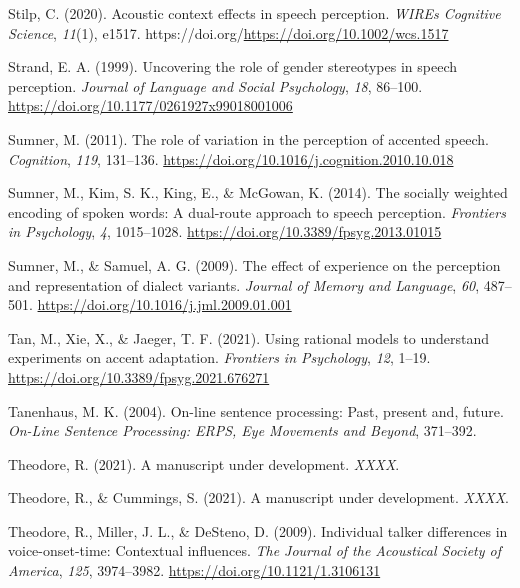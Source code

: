 \documentclass[
  11pt,
  english,
  man,floatsintext]{apa6}
\newlength{\cslhangindent}
\newlength{\cslentryspacingunit} %
\newenvironment{CSLReferences}[2] %
 {%
  \setlength{\parindent}{0pt}
  \ifodd #1
  \let\oldpar\par
  \def\par{\hangindent=\cslhangindent\oldpar}
  \fi
  \setlength{\parskip}{#2\cslentryspacingunit}
 }%
 {}
\begin{document}
\begin{CSLReferences}{1}{0}
\leavevmode{}%
Stilp, C. (2020). Acoustic context effects in speech perception. \emph{WIREs Cognitive Science}, \emph{11}(1), e1517. https://doi.org/\url{https://doi.org/10.1002/wcs.1517}

\leavevmode{}%
Strand, E. A. (1999). Uncovering the role of gender stereotypes in speech perception. \emph{Journal of Language and Social Psychology}, \emph{18}, 86--100. \url{https://doi.org/10.1177/0261927x99018001006}

\leavevmode{}%
Sumner, M. (2011). The role of variation in the perception of accented speech. \emph{Cognition}, \emph{119}, 131--136. \url{https://doi.org/10.1016/j.cognition.2010.10.018}

\leavevmode{}%
Sumner, M., Kim, S. K., King, E., \& McGowan, K. (2014). The socially weighted encoding of spoken words: A dual-route approach to speech perception. \emph{Frontiers in Psychology}, \emph{4}, 1015--1028. \url{https://doi.org/10.3389/fpsyg.2013.01015}

\leavevmode{}%
Sumner, M., \& Samuel, A. G. (2009). The effect of experience on the perception and representation of dialect variants. \emph{Journal of Memory and Language}, \emph{60}, 487--501. \url{https://doi.org/10.1016/j.jml.2009.01.001}

\leavevmode{}%
Tan, M., Xie, X., \& Jaeger, T. F. (2021). Using rational models to understand experiments on accent adaptation. \emph{Frontiers in Psychology}, \emph{12}, 1--19. \url{https://doi.org/10.3389/fpsyg.2021.676271}

\leavevmode{}%
Tanenhaus, M. K. (2004). On-line sentence processing: Past, present and, future. \emph{On-Line Sentence Processing: ERPS, Eye Movements and Beyond}, 371--392.

\leavevmode{}%
Theodore, R. (2021). A manuscript under development. \emph{XXXX}.

\leavevmode{}%
Theodore, R., \& Cummings, S. (2021). A manuscript under development. \emph{XXXX}.

\leavevmode{}%
Theodore, R., Miller, J. L., \& DeSteno, D. (2009). Individual talker differences in voice-onset-time: Contextual influences. \emph{The Journal of the Acoustical Society of America}, \emph{125}, 3974--3982. \url{https://doi.org/10.1121/1.3106131}


\end{CSLReferences}
\end{document}
